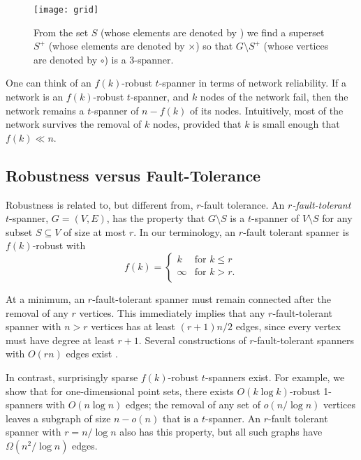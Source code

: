 \documentclass{patmorin}
\begin{document}
\begin{figure}
  \begin{center}
    \texttt{[image: grid]}
  \end{center}
  \caption{From the set $S$ (whose elements are denoted by \textbullet)
  we find a superset $S^+$ (whose elements are denoted by $\times$)
  so that $G\setminus S^+$ (whose vertices are denoted by $\circ$) is a 3-spanner.}
\end{figure}

One can think of an $f(k)$-robust $t$-spanner in terms of network
reliability.  If a network is an $f(k)$-robust $t$-spanner, and $k$ nodes
of the network fail, then the network remains a $t$-spanner of $n-f(k)$
of its nodes.  Intuitively, most of the network survives the removal of
$k$ nodes, provided that $k$ is small enough that $f(k)\ll n$.

\subsection{Robustness versus Fault-Tolerance}

Robustness is related to, but different from, $r$-fault tolerance.
An \emph{$r$-fault-tolerant} $t$-spanner, $G=(V,E)$, has the property
that $G\setminus S$ is a $t$-spanner of $V\setminus S$ for any subset
$S\subseteq V$ of size at most $r$.  In our terminology, an $r$-fault
tolerant spanner is $f(k)$-robust with
\[
    f(k) = \begin{cases}k & \text{for $k \le r$}  \\
                   \infty & \text{for $k > r$.}  \\
   \end{cases}
\]

At a minimum, an $r$-fault-tolerant spanner must remain connected
after the removal of any $r$ vertices.  This immediately implies
that any $r$-fault-tolerant spanner with $n>r$ vertices has at least
$(r+1)n/2$ edges, since every vertex must have degree at least $r+1$.
Several constructions of $r$-fault-tolerant spanners with $O(rn)$ edges
exist \cite{cz04,lns02,l99}.

In contrast, surprisingly sparse $f(k)$-robust $t$-spanners exist.
For example, we show that for one-dimensional point sets, there exists
$O(k\log k)$-robust 1-spanners with $O(n\log n)$ edges; the removal of
any set of $o(n/\log n)$ vertices leaves a subgraph of size $n-o(n)$ that
is a $t$-spanner.  An $r$-fault tolerant spanner with $r=n/\log n$ also
has this property, but all such graphs have $\Omega(n^2/\log n)$ edges.
\end{document}
